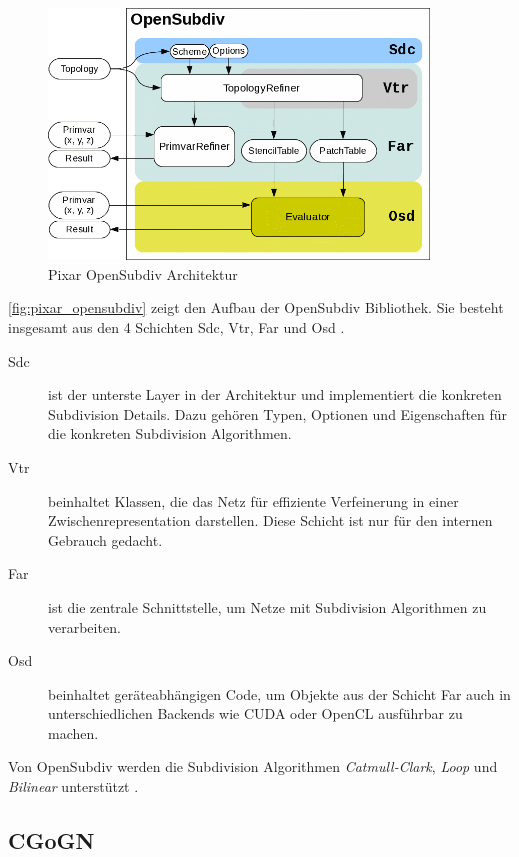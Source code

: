 \begin{figure}
  \centering
  \includegraphics[width=0.9\textwidth]{content/media/pixar_opensubdiv}
  \caption{Pixar OpenSubdiv Architektur \cite{Pixar.27.07.2015}}
  \label{fig:pixar_opensubdiv}
\end{figure}

\autoref{fig:pixar_opensubdiv} zeigt den Aufbau der OpenSubdiv Bibliothek.
Sie besteht insgesamt aus den 4 Schichten \ac{Sdc}, \ac{Vtr}, \ac{Far} und \ac{Osd} \cite{Pixar.27.07.2015}.

\begin{description}
 \item[\acs{Sdc}] ist der unterste Layer in der Architektur und implementiert die konkreten Subdivision Details.
 Dazu gehören Typen, Optionen und Eigenschaften für die konkreten Subdivision Algorithmen.
 \item[\acs{Vtr}] beinhaltet Klassen, die das Netz für effiziente Verfeinerung in einer Zwischenrepresentation darstellen.
 Diese Schicht ist nur für den internen Gebrauch gedacht.
 \item[\acs{Far}] ist die zentrale Schnittstelle, um Netze mit Subdivision Algorithmen zu verarbeiten.
 \item[\acs{Osd}] beinhaltet geräteabhängigen Code, um Objekte aus der Schicht \acs{Far} auch in unterschiedlichen Backends wie
 \acs{CUDA} oder OpenCL ausführbar zu machen.
\end{description}

Von OpenSubdiv werden die Subdivision Algorithmen \emph{Catmull-Clark}, \emph{Loop} und \emph{Bilinear} unterstützt \cite{Pixar.27.07.2015}. 

\subsection{CGoGN}


